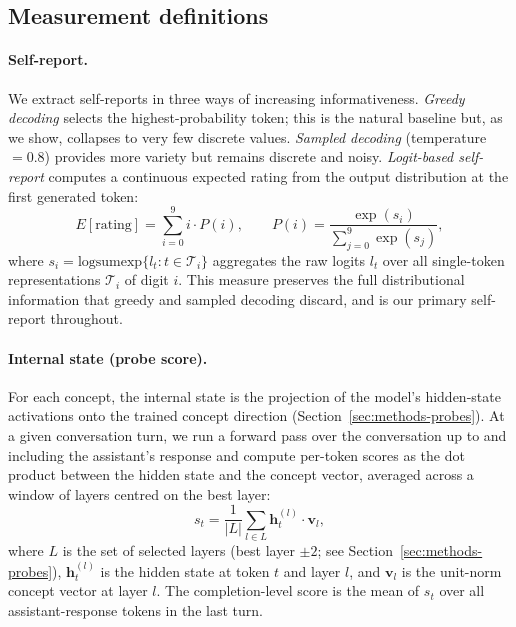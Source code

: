 \documentclass[10pt]{article}
\begin{document}
\subsection{Measurement definitions}
\label{sec:methods-measurement}

\paragraph{Self-report.}
We extract self-reports in three ways of increasing informativeness.
\emph{Greedy decoding} selects the highest-probability token; this is the natural baseline but, as we show, collapses to very few discrete values.
\emph{Sampled decoding} (temperature $= 0.8$) provides more variety but remains discrete and noisy.
\emph{Logit-based self-report} computes a continuous expected rating from the output distribution at the first generated token:
\begin{equation}
  \label{eq:logit-rating}
  E[\text{rating}] = \sum_{i=0}^{9} i \cdot P(i), \qquad
  P(i) = \frac{\exp(s_i)}{\sum_{j=0}^{9}\exp(s_j)},
\end{equation}
where $s_i = \text{logsumexp}\{l_t : t \in \mathcal{T}_i\}$ aggregates the raw logits $l_t$ over all single-token representations $\mathcal{T}_i$ of digit $i$.
This measure preserves the full distributional information that greedy and sampled decoding discard, and is our primary self-report throughout.

\paragraph{Internal state (probe score).}
For each concept, the internal state is the projection of the model's hidden-state activations onto the trained concept direction (Section~\ref{sec:methods-probes}).
At a given conversation turn, we run a forward pass over the conversation up to and including the assistant's response and compute per-token scores as the dot product between the hidden state and the concept vector, averaged across a window of layers centred on the best layer:
\begin{equation}
  \label{eq:probe-score}
  s_t = \frac{1}{|L|}\sum_{l \in L} \mathbf{h}_t^{(l)} \cdot \mathbf{v}_l,
\end{equation}
where $L$ is the set of selected layers (best layer $\pm 2$; see Section~\ref{sec:methods-probes}), $\mathbf{h}_t^{(l)}$ is the hidden state at token $t$ and layer $l$, and $\mathbf{v}_l$ is the unit-norm concept vector at layer $l$.
The completion-level score is the mean of $s_t$ over all assistant-response tokens in the last turn.
\end{document}
